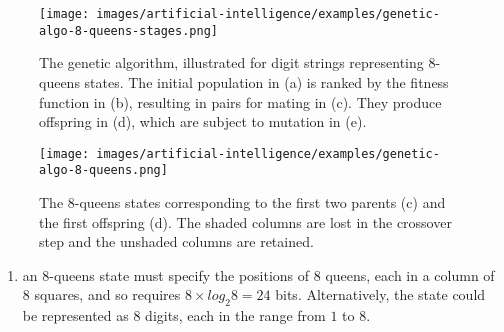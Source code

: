 \begin{figure}[H]
    \centering
    \texttt{[image: images/artificial-intelligence/examples/genetic-algo-8-queens-stages.png]}    
    \caption{
        The genetic algorithm, illustrated for digit strings representing 8-queens states.
        The initial population in (a) is ranked by the fitness function in (b), resulting in pairs for mating in (c). They produce offspring in (d), which are subject to mutation in (e).
        \cite{ai/book/Artificial-Intelligence-A-Modern-Approach/Russell-Norvig}
    }
\end{figure}


\begin{figure}[H]
    \centering
    \texttt{[image: images/artificial-intelligence/examples/genetic-algo-8-queens.png]}
    \caption{
        The 8-queens states corresponding to the first two parents (c) and the first offspring (d). 
        The shaded columns are lost in the crossover step and the unshaded columns are retained.
        \cite{ai/book/Artificial-Intelligence-A-Modern-Approach/Russell-Norvig}
    }
    \label{fig:enter-label}
\end{figure}


\begin{enumerate}
    \item an $8$-queens state must specify the positions of $8$ queens, each in a column of $8$ squares, and so requires $8 \times log_2 8 = 24$ bits. 
    Alternatively, the state could be represented as 8 digits, each in the range from $1$ to $8$. 
    \hfill \cite{ai/book/Artificial-Intelligence-A-Modern-Approach/Russell-Norvig}
\end{enumerate}

















